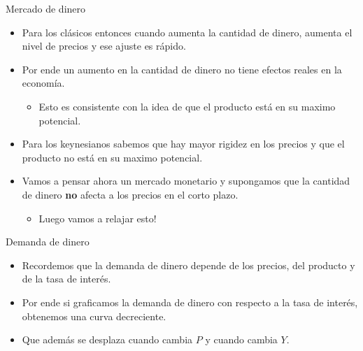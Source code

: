 \documentclass{beamer}
\begin{document}
\begin{frame}{Mercado de dinero}
    \begin{itemize}
        \item Para los clásicos entonces cuando aumenta la cantidad de dinero, aumenta el nivel de precios y ese ajuste es rápido.
        \item Por ende un aumento en la cantidad de dinero no tiene efectos reales en la economía.
        \begin{itemize}
            \item Esto es consistente con la idea de que el producto está en su maximo potencial.
        \end{itemize}
        \item Para los keynesianos sabemos que hay mayor rigidez en los precios y que el producto no está en su maximo potencial.
        \item Vamos a pensar ahora un mercado monetario y supongamos que la cantidad de dinero \textbf{no} afecta a los precios en el corto plazo.
        \begin{itemize}
            \item Luego vamos a relajar esto!
        \end{itemize}
    \end{itemize}
\end{frame}
\begin{frame}{Demanda de dinero}
    \small
    \begin{itemize}
        \item Recordemos que la demanda de dinero depende de los precios, del producto y de la tasa de interés.
        \item Por ende si graficamos la demanda de dinero con respecto a la tasa de interés, obtenemos una curva decreciente.
        \item Que además se desplaza cuando cambia $P$ y cuando cambia $Y$.
    \end{itemize}
    \begin{center}
        \begin{figure}[H]
            \renewcommand{\figurename}{Figure}
            \begin{center}
            \end{center}
        \end{figure}
    \end{center}

\end{frame}
\end{document}
